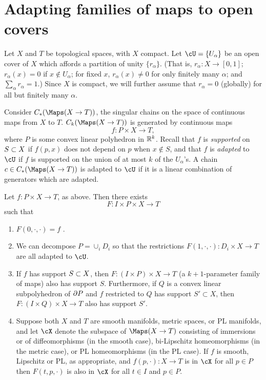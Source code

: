 
\section{Adapting families of maps to open covers}  \label{sec:localising}


Let $X$ and $T$ be topological spaces, with $X$ compact.
Let $\cU = \{U_\alpha\}$ be an open cover of $X$ which affords a partition of
unity $\{r_\alpha\}$.
(That is, $r_\alpha : X \to [0,1]$; $r_\alpha(x) = 0$ if $x\notin U_\alpha$;
for fixed $x$, $r_\alpha(x) \ne 0$ for only finitely many $\alpha$; and $\sum_\alpha r_\alpha = 1$.)
Since $X$ is compact, we will further assume that $r_\alpha = 0$ (globally) 
for all but finitely many $\alpha$.

Consider  $C_*(\Maps(X\to T))$, the singular chains on the space of continuous maps from $X$ to $T$.
$C_k(\Maps(X \to T))$ is generated by continuous maps
\[
	f: P\times X \to T ,
\]
where $P$ is some convex linear polyhedron in $\mathbb{R}^k$.
Recall that $f$ is {\it supported} on $S\subset X$ if $f(p, x)$ does not depend on $p$ when
$x \notin S$, and that $f$ is {\it adapted} to $\cU$ if 
$f$ is supported on the union of at most $k$ of the $U_\alpha$'s.
A chain $c \in C_*(\Maps(X \to T))$ is adapted to $\cU$ if it is a linear combination of 
generators which are adapted.

\begin{lemma} \label{basic_adaptation_lemma}
Let $f: P\times X \to T$, as above.
Then there exists
\[
	F: I \times P\times X \to T
\]
such that
\begin{enumerate}
\item $F(0, \cdot, \cdot) = f$ .
\item We can decompose $P = \cup_i D_i$ so that
the restrictions $F(1, \cdot, \cdot) : D_i\times X\to T$ are all adapted to $\cU$.
\item If $f$ has support $S\subset X$, then
$F: (I\times P)\times X\to T$ (a $k{+}1$-parameter family of maps) also has support $S$.
Furthermore, if $Q$ is a convex linear subpolyhedron of $\partial P$ and $f$ restricted to $Q$
has support $S' \subset X$, then
$F: (I\times Q)\times X\to T$ also has support $S'$.
\item Suppose both $X$ and $T$ are smooth manifolds, metric spaces, or PL manifolds, and 
let $\cX$ denote the subspace of $\Maps(X \to T)$ consisting of immersions or of diffeomorphisms (in the smooth case), 
bi-Lipschitz homeomorphisms (in the metric case), or PL homeomorphisms (in the PL case).
 If $f$ is smooth, Lipschitz or PL, as appropriate, and $f(p, \cdot):X\to T$ is in $\cX$ for all $p \in P$
then $F(t, p, \cdot)$ is also in $\cX$ for all $t\in I$ and $p\in P$.
\end{enumerate}
\end{lemma}

